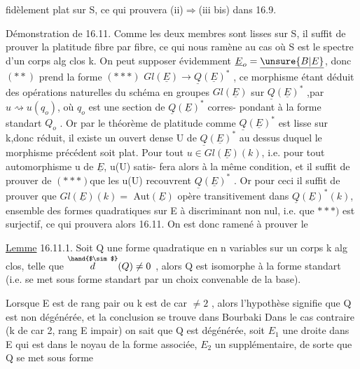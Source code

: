 
fidèlement plat sur S, ce qui prouvera  (ii)$\Longrightarrow$(iii bis) dans  16.9.

Démonstration de 16.11.  Comme les deux membres sont lisses sur S,
il suffit de prouver la platitude fibre par fibre, ce qui nous ramène au
cas où S est le spectre d'un corps alg clos k.  On peut  supposer
évidemment $\underline{E}_o=\underline{\unsure{B|E}}$, donc $(**)$ prend la forme
$(***)$   $Gl(\underline{E})\longrightarrow\underline{Q}(\underline{E})^*$ ,
ce morphisme étant déduit des opérations naturelles du schéma en groupes
$Gl(\underline{E})$ sur $\underline{Q}(\underline{E})^*$ ,par $u\rightsquigarrow u(q_o)$, où $q_o$ est une section de $\underline{Q}(\underline{E})^*$ corres-%
pondant à la forme standart $Q_o$ . Or par le théorème de platitude \hand{,}
comme $\underline{Q}(\underline{E})^*$ est lisse sur k,donc réduit, il existe un ouvert dense U de
$\underline{Q}(\underline{E})^*$ au dessus duquel le morphisme précédent soit plat.  Pour tout 
$u\in Gl(\underline{E})(k)$, i.e. pour tout automorphisme u de $\underline{E}$, u(U) satis-%
fera alors à la même condition, et il suffit\hand{,} de prouver\hand{),} 
de $(***)$\hand{,}que les u(U) recouvrent $\underline{Q}(\underline{E})^*$ . Or pour ceci il suffit de prouver
que $Gl(\underline{E})(k)=$ Aut$(\underline{E})$ opère transitivement dans $\underline{Q}(\underline{E})^*(k)$, ensemble des
formes quadratiques  sur \hand{$\checkmark$}E à discriminant non nul,  i.e. que
\deleted{(}$***)$ est surjectif, ce \hand{\unsure{|}}qui prouvera alors 16.11.  On est donc ramené à
prouver le

\uline{Lemme} 16.11.1.  Soit Q une forme quadratique en n variables sur un corps k
alg clos, telle que $\overset{\hand{$\sim$}}{d}(Q)\neq 0$ , alors Q est isomorphe à la forme standart
(i.e. se met sous forme standart par un choix convenable de la base).

Lorsque E est de rang pair ou k est de car $\neq 2$ , alors l'hypothèse
signifie que Q est non dégénérée, et la conclusion se trouve dans Bourbaki
Dans le cas contraire (k de car 2,  rang E impair)  on sait que Q est
dégénérée,  soit $E_1$ une droite dans E qui est dans le noyau de la
forme associée, $E_2$ un supplémentaire, de sorte que Q se met sous forme

